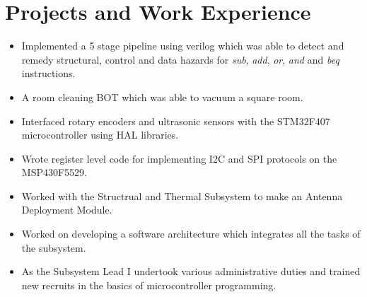 \documentclass{resume}
\begin{document}
\section{Projects and Work Experience}
    \begin{itemize}\setlength{\itemsep}{0pt}\setlength{\parskip}{0pt}\vspace{-0.5em}
        \item Implemented a 5 stage pipeline using verilog which was able to detect and remedy structural, control and data hazards for \emph{sub}, \emph{add}, \emph{or}, \emph{and} and \emph{beq} instructions.
    \end{itemize}
\begin{itemize}\setlength{\itemsep}{0pt}\setlength{\parskip}{0pt}\vspace{-0.5em}
    \item A room cleaning BOT which was able to vacuum a square room.
    \item Interfaced rotary encoders and ultrasonic sensors with the STM32F407 microcontroller using HAL libraries.
\end{itemize}
\begin{itemize}\setlength{\itemsep}{0pt}\setlength{\parskip}{0pt}\vspace{-0.5em}
    \item Wrote register level code for implementing I2C and SPI protocols on the MSP430F5529.
    \item Worked with the Structrual and Thermal Subsystem to make an Antenna Deployment Module.
    \item Worked on developing a software architecture which integrates all the tasks of the subsystem.
    \item As the Subsystem Lead I undertook various administrative duties and trained new recruits in the basics of microcontroller programming.
\end{itemize}

\end{document}
